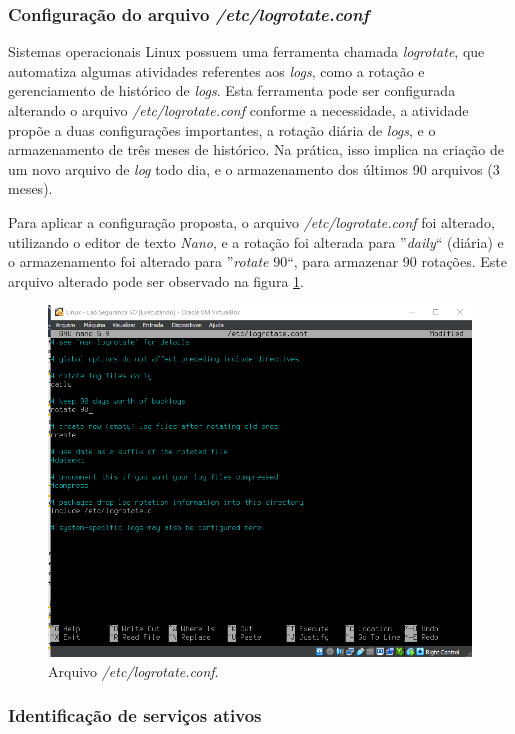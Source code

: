 \documentclass[
	12pt,				%
	oneside,   	        %
	a4paper,			%
	english,			%
	french,				%
	spanish,			%
	brazil,				%
	]{pacotes/abntex2}
\begin{document}
\subsubsection{Configuração do arquivo \textit{/etc/logrotate.conf}}
Sistemas operacionais Linux possuem uma ferramenta chamada \textit{logrotate}, que automatiza algumas atividades referentes aos \textit{logs}, como a rotação e gerenciamento de histórico de \textit{logs}. Esta ferramenta pode ser configurada alterando o arquivo \textit{/etc/logrotate.conf} conforme a necessidade, a atividade propõe a duas configurações importantes, a rotação diária de \textit{logs}, e o armazenamento de três meses de histórico. Na prática, isso implica na criação de um novo arquivo de \textit{log} todo dia, e o armazenamento dos últimos 90 arquivos (3 meses).

Para aplicar a configuração proposta, o arquivo \textit{/etc/logrotate.conf} foi alterado, utilizando o editor de texto \textit{Nano}, e a rotação foi alterada para ''\textit{daily}`` (diária) e o armazenamento foi alterado para ''\textit{rotate} 90``, para armazenar 90 rotações. Este arquivo alterado pode ser observado na figura \ref{fig:logrotate}.

\begin{figure}[H]
  \centering
  \includegraphics[scale=0.7]{figuras/logrotate.png}
  \caption{Arquivo \textit{/etc/logrotate.conf}.}
  \label{fig:logrotate}
\end{figure}

\subsubsection{Identificação de serviços ativos}
\end{document}
